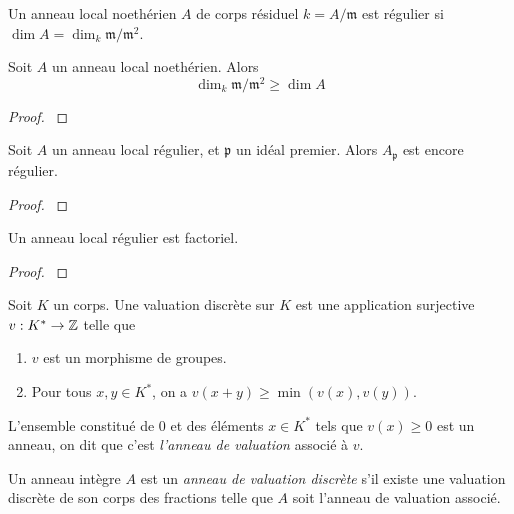 \begin{defn}
Un anneau local noethérien $A$ de corps résiduel $k=A/\mathfrak{m}$ est régulier si $\dim A =\dim_k\mathfrak{m}/\mathfrak{m}^2$.
\end{defn}

\begin{prop}
Soit $A$ un anneau local noethérien. Alors $$\dim_k\mathfrak{m}/\mathfrak{m}^2\geq \dim A $$
\end{prop}
\begin{proof}
\cite[5.14]{Matsumura} 
\end{proof}

\begin{thm}
Soit $A$ un anneau local régulier, et $\mathfrak{p}$ un idéal premier. Alors $A_\mathfrak{p}$ est encore régulier.
\end{thm}
\begin{proof}
\cite[19.3]{Matsumura}
\end{proof}

\begin{thm}\label{reglocufd}
Un anneau local régulier est factoriel.
\end{thm}
\begin{proof}
\cite[20.3]{Matsumura}
\end{proof}

\begin{defn}
Soit $K$ un corps. Une valuation discrète sur $K$ est une application surjective $v:K^*\rightarrow \mathbb{Z}$ telle que
\begin{enumerate}
\item $v$ est un morphisme de groupes.
\item Pour tous $x,y\in K^*$, on a $v(x+y)\geq \min(v(x),v(y))$.
\end{enumerate}
L'ensemble constitué de $0$ et des éléments $x\in K^*$ tels que $v(x)\geq 0$ est un anneau, on dit que c'est \textit{l'anneau de valuation} associé à $v$.
\end{defn}

\begin{defn}
Un anneau intègre $A$ est un \textit{anneau de valuation discrète} s'il existe une valuation discrète de son corps des fractions telle que $A$ soit l'anneau de valuation associé.
\end{defn}

